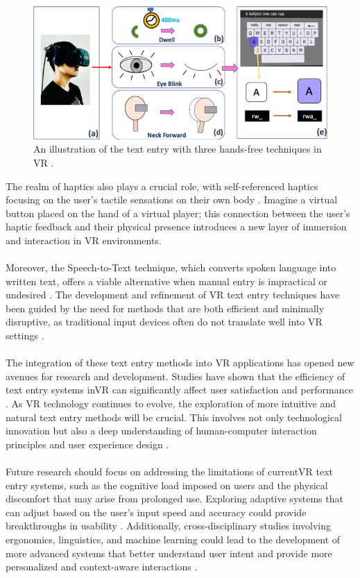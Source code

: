 \begin{figure}[h!]
    \centering
    \includegraphics[width=0.7\linewidth]{Background/freehand_Blink.png}
    \caption{An illustration of the text entry with three hands-free techniques in VR \cite{Leng2022}.}
    \label{fig:enter-label}
\end{figure}
\noindent
The realm of haptics also plays a crucial role, with self-referenced haptics focusing on the user's tactile sensations on their own body \cite{hayward2022xr}. Imagine a virtual button placed on the hand of a virtual player; this connection between the user's haptic feedback and their physical presence introduces a new layer of immersion and interaction in \ac{VR} environments.\\ \\ 
Moreover, the Speech-to-Text technique, which converts spoken language into written text, offers a viable alternative when manual entry is impractical or undesired \cite{baljko2006automatic}. The development and refinement of VR text entry techniques have been guided by the need for methods that are both efficient and minimally disruptive, as traditional input devices often do not translate well into \ac{VR} settings \cite{grubert2018text}.\\ \\
The integration of these text entry methods into \ac{VR} applications has opened new avenues for research and development. Studies have shown that the efficiency of text entry systems in\ac{VR} can significantly affect user satisfaction and performance \cite{mcgill2015dovetail}. As \ac{VR} technology continues to evolve, the exploration of more intuitive and natural text entry methods will be crucial. This involves not only technological innovation but also a deep understanding of human-computer interaction principles and user experience design \cite{wickens2015engineering}.\\ \\
Future research should focus on addressing the limitations of current\ac{VR} text entry systems, such as the cognitive load imposed on users and the physical discomfort that may arise from prolonged use. Exploring adaptive systems that can adjust based on the user's input speed and accuracy could provide breakthroughs in usability \cite{hincapie2014metaanalysis}. Additionally, cross-disciplinary studies involving ergonomics, linguistics, and machine learning could lead to the development of more advanced systems that better understand user intent and provide more personalized and context-aware interactions \cite{zhang2017deep}.\\ \\
